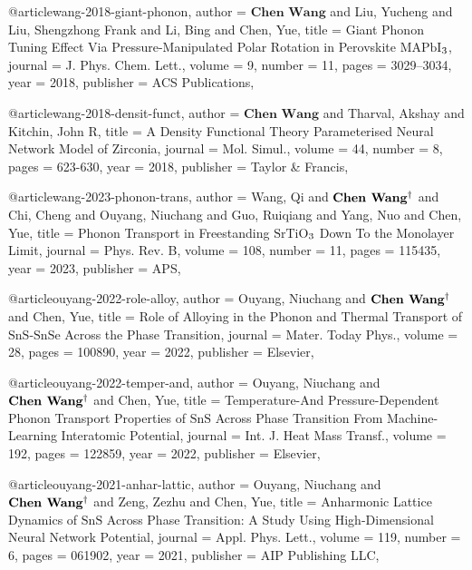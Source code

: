 @article{wang-2018-giant-phonon,
  author =	 {$\textbf{Chen Wang}$ and Liu, Yucheng and Liu, Shengzhong Frank and Li, Bing and Chen, Yue},
  title =	 {Giant Phonon Tuning Effect Via Pressure-Manipulated Polar Rotation in Perovskite $\mathrm{MAPbI}$$\textsubscript{3}$},
  journal =	 {J. Phys. Chem. Lett.},
  volume =	 9,
  number =	 11,
  pages =	 {3029--3034},
  year =	 2018,
  publisher =	 {ACS Publications},
}

@article{wang-2018-densit-funct,
  author =	 {$\textbf{Chen Wang}$ and Tharval, Akshay and Kitchin, John R},
  title =	 {A Density Functional Theory Parameterised Neural Network Model of Zirconia},
  journal =	 {Mol. Simul.},
  volume =	 44,
  number =	 8,
  pages =	 {623-630},
  year =	 2018,
  publisher =	 {Taylor \& Francis},
}

@article{wang-2023-phonon-trans,
  author =	 {Wang, Qi and $\textbf{Chen Wang}\textsuperscript{\dag}$ and Chi, Cheng and Ouyang, Niuchang and Guo, Ruiqiang and Yang, Nuo and Chen,
                  Yue},
  title =	 {Phonon Transport in Freestanding $\mathrm{SrTiO}$$\textsubscript{3}$ Down To the Monolayer Limit},
  journal =	 {Phys. Rev. B},
  volume =	 108,
  number =	 11,
  pages =	 115435,
  year =	 2023,
  publisher =	 {APS},
}

@article{ouyang-2022-role-alloy,
  author =	 {Ouyang, Niuchang and $\textbf{Chen Wang}\textsuperscript{\dag}$ and Chen, Yue},
  title =	 {Role of Alloying in the Phonon and Thermal Transport of $\mathrm{SnS}$-$\mathrm{SnSe}$ Across the Phase Transition},
  journal =	 {Mater. Today Phys.},
  volume =	 28,
  pages =	 100890,
  year =	 2022,
  publisher =	 {Elsevier},
}

@article{ouyang-2022-temper-and,
  author =	 {Ouyang, Niuchang and $\textbf{Chen Wang}\textsuperscript{\dag}$ and Chen, Yue},
  title =	 {Temperature-And Pressure-Dependent Phonon Transport Properties of $\mathrm{SnS}$ Across Phase Transition From
                  Machine-Learning Interatomic Potential},
  journal =	 {Int. J. Heat Mass Transf.},
  volume =	 192,
  pages =	 122859,
  year =	 2022,
  publisher =	 {Elsevier},
}

@article{ouyang-2021-anhar-lattic,
  author =	 {Ouyang, Niuchang and $\textbf{Chen Wang}\textsuperscript{\dag}$ and Zeng, Zezhu and Chen, Yue},
  title =	 {Anharmonic Lattice Dynamics of $\mathrm{SnS}$ Across Phase Transition: A Study Using High-Dimensional Neural
                  Network Potential},
  journal =	 {Appl. Phys. Lett.},
  volume =	 119,
  number =	 6,
  pages =	 061902,
  year =	 2021,
  publisher =	 {AIP Publishing LLC},
}


